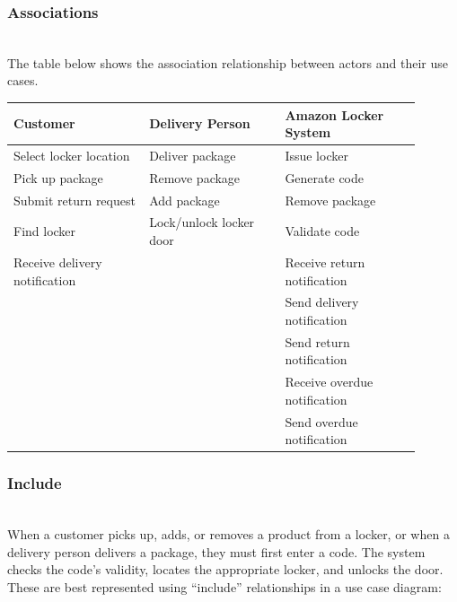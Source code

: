 \subsubsection{Associations}\label{v05pu51kpwwl89icVbRMd}
\\
The table below shows the association relationship between actors and their use cases.

\begin{center}
\begin{tabular}{|p{0.3\linewidth}|p{0.3\linewidth}|p{0.3\linewidth}|}
\hline
\textbf{Customer} & \textbf{Delivery Person} & \textbf{Amazon Locker System} \\
\hline
Select locker location & Deliver package & Issue locker \\
\hline
Pick up package & Remove package & Generate code \\
\hline
Submit return request & Add package & Remove package \\
\hline
Find locker & Lock/unlock locker door & Validate code \\
\hline
Receive delivery notification &  & Receive return notification \\
\hline
 &  & Send delivery notification \\
\hline
 &  & Send return notification \\
\hline
 &  & Receive overdue notification \\
\hline
 &  & Send overdue notification \\
\hline
\end{tabular}
\end{center}



\subsubsection{Include}\label{E6c3ykAkGs3AZ07d6dOGz-2}
\\
When a customer picks up, adds, or removes a product from a locker, or when a delivery person delivers a package, they must first enter a code. The system checks the code's validity, locates the appropriate locker, and unlocks the door. These are best represented using ``include'' relationships in a use case diagram:

